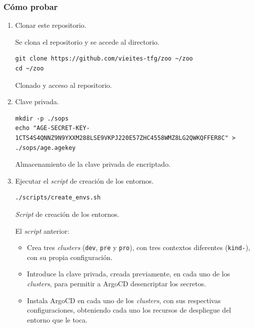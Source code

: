 \subsubsection*{Cómo probar}

\begin{enumerate}
  \item Clonar este repositorio.

    Se clona el repositorio y se accede al directorio.

\begin{listing}[!ht]
  \begin{verbatim}
git clone https://github.com/vieites-tfg/zoo ~/zoo
cd ~/zoo
\end{verbatim}
\caption{Clonado y acceso al repositorio.}
\end{listing}

\item Clave privada.

\begin{listing}[!ht]
  \begin{verbatim}
mkdir -p ./sops
echo "AGE-SECRET-KEY-1CTS4S4QNNZ9N9YXXM288LSE9VKPJ220E57ZHC4558WMZ8LG2QWKQFFER8C" > ./sops/age.agekey
\end{verbatim}
\caption{Almacenamiento de la clave privada de encriptado.}
\end{listing}

  \item Ejecutar el \textit{script} de creación de los entornos.

\begin{listing}[!ht]
  \begin{verbatim}
./scripts/create_envs.sh
\end{verbatim}
\caption{\textit{Script} de creación de los entornos.}
\end{listing}

  El \textit{script} anterior:
    \begin{itemize}
      \item Crea tres \textit{clusters} (\texttt{dev}, \texttt{pre} y \texttt{pro}), con tres contextos diferentes (\texttt{kind-}), con su propia configuración.
      \item Introduce la clave privada, creada previamente, en cada uno de los \textit{clusters}, para permitir a ArgoCD desencriptar los secretos.
      \item Instala ArgoCD en cada uno de los \textit{clusters}, con sus respectivas configuraciones, obteniendo cada uno los recursos de despliegue del entorno que le toca.
    \end{itemize}


\end{enumerate}
